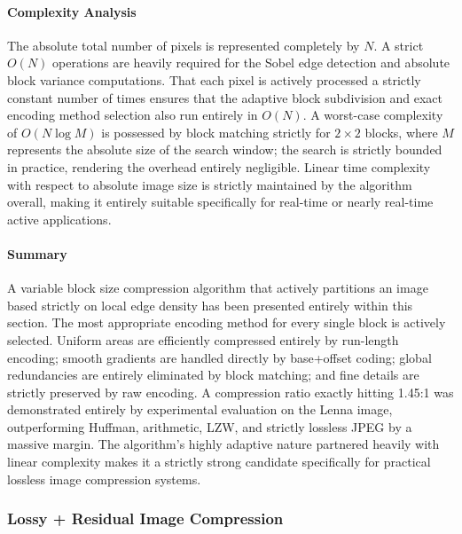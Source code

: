 \paragraph{Complexity Analysis}

The absolute total number of pixels is represented completely by $N$. A strict $O(N)$ operations are heavily required for the Sobel edge detection and absolute block variance computations. That each pixel is actively processed a strictly constant number of times ensures that the adaptive block subdivision and exact encoding method selection also run entirely in $O(N)$. A worst-case complexity of $O(N \log M)$ is possessed by block matching strictly for $2\times2$ blocks, where $M$ represents the absolute size of the search window; the search is strictly bounded in practice, rendering the overhead entirely negligible. Linear time complexity with respect to absolute image size is strictly maintained by the algorithm overall, making it entirely suitable specifically for real-time or nearly real-time active applications.

\paragraph{Summary}

A variable block size compression algorithm that actively partitions an image based strictly on local edge density has been presented entirely within this section. The most appropriate encoding method for every single block is actively selected. Uniform areas are efficiently compressed entirely by run-length encoding; smooth gradients are handled directly by base+offset coding; global redundancies are entirely eliminated by block matching; and fine details are strictly preserved by raw encoding. A compression ratio exactly hitting 1.45:1 was demonstrated entirely by experimental evaluation on the Lenna image, outperforming Huffman, arithmetic, LZW, and strictly lossless JPEG by a massive margin. The algorithm’s highly adaptive nature partnered heavily with linear complexity makes it a strictly strong candidate specifically for practical lossless image compression systems.
















\subsubsection{Lossy + Residual Image Compression}

